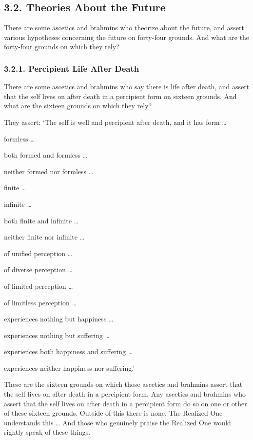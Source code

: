 \documentclass[12pt,openany]{book}%
\begin{document}
\subsection*{3.2. Theories About the Future }

There are some ascetics and brahmins who theorize about the future, and assert various hypotheses concerning the future on forty-four grounds. And what are the forty-four grounds on which they rely? 

\subsubsection*{3.2.1. Percipient Life After Death }

There are some ascetics and brahmins who say there is life after death, and assert that the self lives on after death in a percipient form on sixteen grounds. And what are the sixteen grounds on which they rely? 

They assert: ‘The self is well and percipient after death, and it has form … 

formless … 

both formed and formless … 

neither formed nor formless … 

finite … 

infinite … 

both finite and infinite … 

neither finite nor infinite … 

of unified perception … 

of diverse perception … 

of limited perception … 

of limitless perception … 

experiences nothing but happiness … 

experiences nothing but suffering … 

experiences both happiness and suffering … 

experiences neither happiness nor suffering.’ 

These are the sixteen grounds on which those ascetics and brahmins assert that the self lives on after death in a percipient form. Any ascetics and brahmins who assert that the self lives on after death in a percipient form do so on one or other of these sixteen grounds. Outside of this there is none. The Realized One understands this … And those who genuinely praise the Realized One would rightly speak of these things. 
\end{document}

